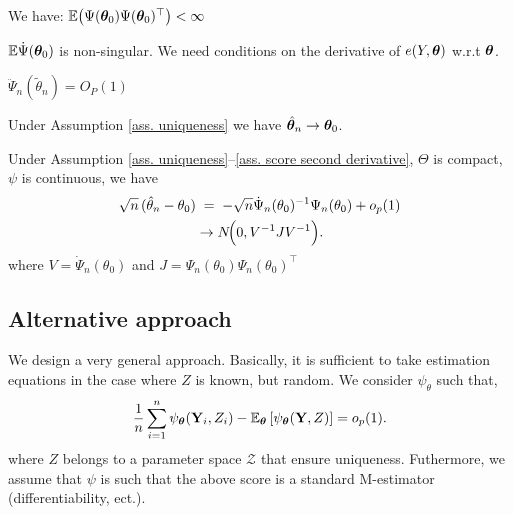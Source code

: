 \documentclass[twoside,11pt]{article}
\newcommand{\jb}[2][]{\todo[color=jbcolor, caption={JB}, #1]{#2}}
\begin{document}
\begin{assumptionA}\label{ass. bounded squared score}
We have:
$\mathbb{E} \bigl(\Psi({\bm{\theta}}_0) \Psi({\bm{\theta}}_0)^\top \bigr)<\infty$
\jb{Seems fine.}
\end{assumptionA}

\begin{assumptionA}\label{ass. score derivative}
$\mathbb{E}\dot\Psi({\bm{\theta}}_0)$ is non-singular. We need conditions on the derivative of $e(Y,{\bm{\theta}})$ w.r.t ${\bm{\theta}}$.
\end{assumptionA}

\begin{assumptionA}\label{ass. score second derivative}
$\ddot\Psi_n(\tilde\theta_n)=O_P(1)$
\end{assumptionA}


\begin{theorem}
Under Assumption \ref{ass. uniqueness} we have $ \hat{{\bm{\theta}}}_n \to {\bm{\theta}}_0$.
\end{theorem}

\begin{theorem}
Under Assumption \ref{ass. uniqueness}--\ref{ass. score second derivative}, $\Theta$ is compact, %
$\psi$ is continuous, we have
\begin{align*}
  \sqrt{n}\,(\hat\theta_n - \theta_0)
  &\;=\;
  - \sqrt{n} \dot\Psi_n(\theta_0)^{-1} \Psi_n(\theta_0) +o_p(1) \\
  &\rightarrow N\!\Bigl(0, V^{-1} J V^{-1} \Bigr).
\end{align*}
where $V =\dot\Psi_n(\theta_0) $ and $J= \Psi_n(\theta_0) \Psi_n(\theta_0)^\top$
\end{theorem}



\subsection{Alternative approach}

We design a very general approach. Basically, it is sufficient to take estimation equations in the case where $Z$ is known, but random.
We consider $\psi_\theta$ such that,
\begin{equation}
\frac{1}{n} \sum_{i=1}^n \psi_{\bm{\theta}}({\bf Y}_i, Z_i) -
\mathbb{E}_{\bm{\theta}}
\left[ 
\psi_{\bm{\theta}}({\bf Y}, Z ) 
\right] = o_p(1).
\end{equation}
where $Z$ belongs to a parameter space $\mathcal{Z}$ that ensure uniqueness.
Futhermore, we assume that $\psi$ is such that the above score is a standard M-estimator (differentiability, ect.).
\end{document}
